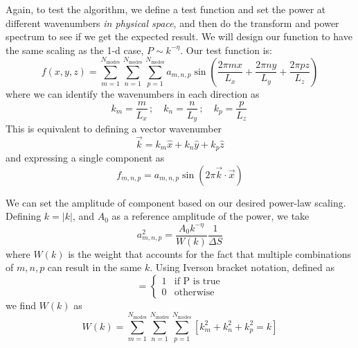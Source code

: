 \documentclass[11pt]{article}
\begin{document}
Again, to test the algorithm, we define a test function and set the power at
different wavenumbers {\em in physical space}, and then do the transform
and power spectrum to see if we get the expected result.  We will design
our function to have the same scaling as the 1-d case, $P \sim k^{-\eta}$.
Our test function
is:
\begin{equation}
f(x,y,z) = \sum_{m=1}^{N_\mathrm{modes}} 
              \sum_{n=1}^{N_\mathrm{modes}} 
              \sum_{p=1}^{N_\mathrm{modes}} 
     a_{m,n,p} \sin \left ( \frac{2\pi m x}{L_x} + 
                            \frac{2\pi n y}{L_y} + 
                            \frac{2\pi p z}{L_z} \right )
\end{equation}
where we can identify the wavenumbers in each direction as
\begin{equation}
k_m = \frac{m}{L_x} \, ; \quad 
k_n = \frac{n}{L_y} \, ; \quad 
k_p = \frac{p}{L_z} \,
\end{equation}
This is equivalent to defining a vector wavenumber
\begin{equation}
\vec{k} = k_m \hat{x} + k_n \hat{y} + k_p \hat{z}
\end{equation}
and expressing a single component as
\begin{equation}
f_{m,n,p} = a_{m,n,p} \sin(2\pi \vec{k}\cdot \vec{x})
\end{equation}



We can set the amplitude of component based on our desired
power-law scaling.  Defining $k = |k|$, and $A_0$ as a
reference amplitude of the power, we take
\begin{equation}
a_{m,n,p}^2 = \frac{A_0 k^{-\eta}}{W(k)} \frac{1}{\Delta S}
\end{equation}
where $W(k)$ is the weight that accounts for the fact that multiple
combinations of $m, n, p$ can result in the same $k$.  Using Iverson bracket
notation, defined as
\begin{equation}
[P] = \begin{cases}
  1 & \text{if P is true} \\
  0 & \text{otherwise}
      \end{cases}
\end{equation}
we find $W(k)$ as
\begin{equation}
W(k) = \sum_{m=1}^{N_\mathrm{modes}}
       \sum_{n=1}^{N_\mathrm{modes}} 
       \sum_{p=1}^{N_\mathrm{modes}} [ k_m^2 + k_n^2 + k_p^2 = k ]
\end{equation}
\end{document}
